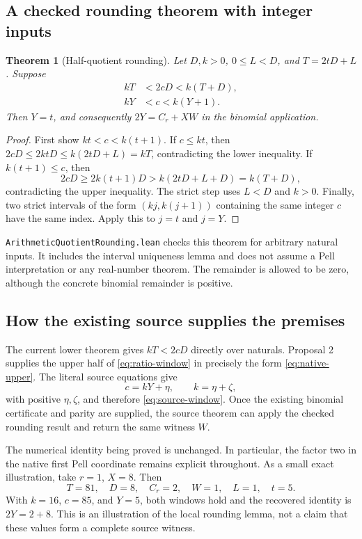 \documentclass[11pt,a4paper]{article}
\newcommand{\code}[1]{\nolinkurl{#1}}
\newtheorem{theorem}{Theorem}[section]
\begin{document}
\subsection{A checked rounding theorem with integer inputs}

\begin{theorem}[Half-quotient rounding]
Let \(D,k>0\), \(0\le L<D\), and \(T=2tD+L\). Suppose
\begin{align}
 kT&<2cD<k(T+D),\label{eq:ratio-window}\\
 kY&<c<k(Y+1).\label{eq:source-window}
\end{align}
Then \(Y=t\), and consequently \(2Y=C_r+XW\) in the binomial application.
\end{theorem}
\begin{proof}
First show \(kt<c<k(t+1)\). If \(c\le kt\), then
\(2cD\le2ktD\le k(2tD+L)=kT\), contradicting the lower inequality.
If \(k(t+1)\le c\), then
\[
 2cD\ge2k(t+1)D>k(2tD+L+D)=k(T+D),
\]
contradicting the upper inequality. The strict step uses \(L<D\) and \(k>0\).
Finally, two strict intervals of the form \((kj,k(j+1))\) containing the same
integer \(c\) have the same index. Apply this to \(j=t\) and \(j=Y\).
\end{proof}

\code{ArithmeticQuotientRounding.lean} checks this theorem for arbitrary
natural inputs. It includes the interval uniqueness lemma and does not assume
a Pell interpretation or any real-number theorem. The remainder is allowed
to be zero, although the concrete binomial remainder is positive.

\subsection{How the existing source supplies the premises}

The current lower theorem gives \(kT<2cD\) directly over naturals.
Proposal 2 supplies the upper half of \eqref{eq:ratio-window} in precisely
the form \eqref{eq:native-upper}. The literal source equations give
\[
 c=kY+\eta,\qquad k=\eta+\zeta,
\]
with positive \(\eta,\zeta\), and therefore \eqref{eq:source-window}.
Once the existing binomial certificate and parity are supplied, the source theorem can apply
the checked rounding result and return the same witness \(W\).

The numerical identity being proved is unchanged. In particular, the factor
two in the native first Pell coordinate remains explicit throughout. As a
small exact illustration, take \(r=1\), \(X=8\). Then
\[
 T=81,\quad D=8,\quad C_r=2,\quad W=1,\quad L=1,\quad t=5.
\]
With \(k=16\), \(c=85\), and \(Y=5\), both windows hold and the recovered
identity is \(2Y=2+8\). This is an illustration of the local rounding lemma,
not a claim that these values form a complete source witness.
\end{document}
